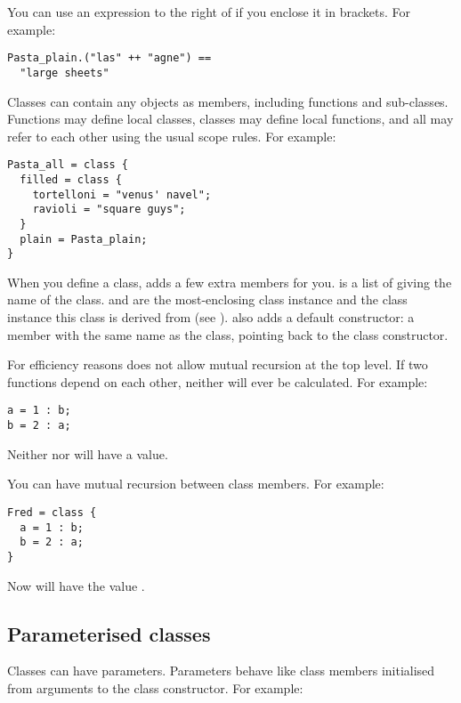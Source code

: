 \noindent
You can use an expression to the right of  if you enclose it in
brackets. For example:

\begin{verbatim}
Pasta_plain.("las" ++ "agne") == 
  "large sheets"
\end{verbatim}

Classes can contain any objects as members, including functions and
sub-classes. Functions may define local classes, classes may define local
functions, and all may refer to each other using the usual scope rules. For
example:

\begin{verbatim}
Pasta_all = class { 
  filled = class { 
    tortelloni = "venus' navel";
    ravioli = "square guys";
  }
  plain = Pasta_plain;
}
\end{verbatim}

When you define a class, \nip{} adds a few extra members for you. 
is a list of  giving the name of the class.  and
 are the most-enclosing class instance and the class instance
this class is derived from (see ). \nip{} also adds
a default constructor: a member with the same name as the class, pointing
back to the class constructor. 

For efficiency reasons \nip{} does not allow mutual recursion at the top
level. If two functions depend on each other, neither will ever be
calculated. For example:

\begin{verbatim}
a = 1 : b;
b = 2 : a;
\end{verbatim}

\noindent
Neither  nor  will have a value.

You can have mutual recursion between class members. For example:

\begin{verbatim}
Fred = class {
  a = 1 : b;
  b = 2 : a;
}
\end{verbatim}

\noindent
Now  will have the value \ct{[1, 2, 1, 2, 1, \ldots{}]}.

\subsection{Parameterised classes}

Classes can have parameters. Parameters behave like class members initialised
from arguments to the class constructor. For example:

